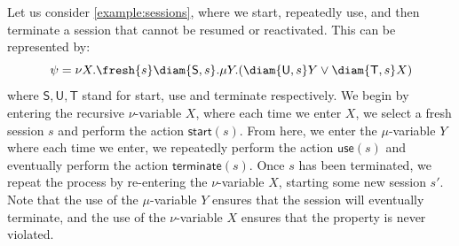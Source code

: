 \begin{example}
Let us consider \cref{example:sessions}, where we start, repeatedly use, and then terminate a session that cannot be resumed or reactivated. 
This can be represented by:
\[
	\psi = \nu X. \fresh{s}\diam{\mathsf{S}, s}.\mu Y.(\diam{\mathsf{U}, s}Y \lor \diam{\mathsf{T}, s}X)
\]
where $\mathsf{S,U,T}$ stand for start, use and terminate respectively.
We begin by entering the recursive $\nu$-variable $X$, where each time we enter $X$, we select a fresh session $s$ and perform the action $\mathsf{start}(s)$. 
From here, we enter the $\mu$-variable $Y$ where each time we enter, we repeatedly perform the action $\mathsf{use}(s)$ and eventually perform the action $\mathsf{terminate}(s)$. 
Once $s$ has been terminated, we repeat the process by re-entering the $\nu$-variable $X$, starting some new session $s'$. 
Note that the use of the $\mu$-variable $Y$ ensures that the session will eventually terminate, and the use of the $\nu$-variable $X$ ensures that the property is never violated.
\end{example}
